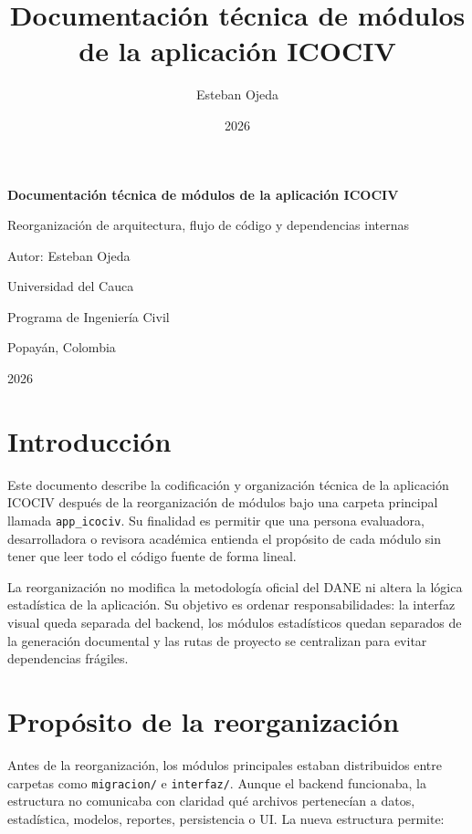 \documentclass[12pt,letterpaper]{article}
\title{Documentación técnica de módulos de la aplicación ICOCIV}
\author{Esteban Ojeda}
\date{2026}
\begin{document}
\begin{titlepage}
    \centering
    \vspace*{1.5cm}
    {\Large\bfseries Documentación técnica de módulos de la aplicación ICOCIV\par}
    \vspace{0.5cm}
    {\large Reorganización de arquitectura, flujo de código y dependencias internas\par}
    \vspace{1.5cm}
    {\large Autor: Esteban Ojeda\par}
    {\large Universidad del Cauca\par}
    {\large Programa de Ingeniería Civil\par}
    \vfill
    {\large Popayán, Colombia\par}
    {\large 2026\par}
\end{titlepage}

\tableofcontents
\newpage

\section{Introducción}

Este documento describe la codificación y organización técnica de la aplicación ICOCIV después de la reorganización de módulos bajo una carpeta principal llamada \texttt{app\_icociv}. Su finalidad es permitir que una persona evaluadora, desarrolladora o revisora académica entienda el propósito de cada módulo sin tener que leer todo el código fuente de forma lineal.

La reorganización no modifica la metodología oficial del DANE ni altera la lógica estadística de la aplicación. Su objetivo es ordenar responsabilidades: la interfaz visual queda separada del backend, los módulos estadísticos quedan separados de la generación documental y las rutas de proyecto se centralizan para evitar dependencias frágiles.

\section{Propósito de la reorganización}

Antes de la reorganización, los módulos principales estaban distribuidos entre carpetas como \texttt{migracion/} e \texttt{interfaz/}. Aunque el backend funcionaba, la estructura no comunicaba con claridad qué archivos pertenecían a datos, estadística, modelos, reportes, persistencia o UI. La nueva estructura permite:
\end{document}
